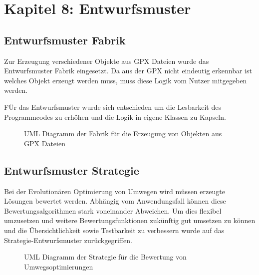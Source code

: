 \section{Kapitel 8: Entwurfsmuster}

\subsection{Entwurfsmuster Fabrik}

Zur Erzeugung verschiedener Objekte aus GPX Dateien wurde das Entwurfsmuster Fabrik eingesetzt. Da aus der GPX nicht eindeutig erkennbar ist welches Objekt erzeugt werden muss, muss diese Logik vom Nutzer mitgegeben werden.

FÜr das Entwurfsmuster wurde sich entschieden um die Lesbarkeit des Programmcodes zu erhöhen und die Logik in eigene Klassen zu Kapseln.

\begin{figure}[H]
  \centering
  
  \caption{UML Diagramm der Fabrik für die Erzeugung von Objekten aus GPX Dateien}
\end{figure}

\subsection{Entwurfsmuster Strategie}

Bei der Evolutionären Optimierung von Umwegen wird müssen erzeugte Lösungen bewertet werden. Abhängig vom Anwendungsfall können diese Bewertungsalgorithmen stark voneinander Abweichen.
Um dies flexibel umzusetzen und weitere Bewertungsfunktionen zukünftig gut umsetzen zu können und die Übersichtlichkeit sowie Testbarkeit zu verbessern wurde auf das Strategie-Entwurfsmuster zurückgegriffen.

\begin{figure}[H]
  \centering
  
  \caption{UML Diagramm der Strategie für die Bewertung von Umwegsoptimierungen}
\end{figure}